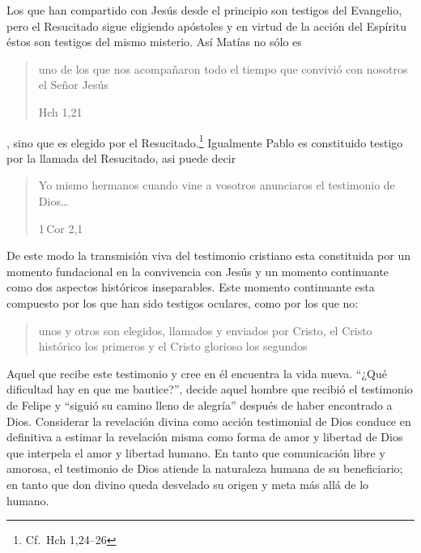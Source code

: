 Los que han compartido con Jesús desde el principio son testigos del Evangelio,
pero el Resucitado sigue eligiendo apóstoles y en virtud de la acción del
Espíritu éstos son testigos del mismo misterio.\autocite[Cf.][576]{ninot2009tf}
Así Matías no sólo es \blockquote[Hch 1,21]{uno de los que nos acompañaron todo
  el tiempo que convivió con nosotros el Señor Jesús}, sino que es elegido por
el Resucitado.\footnote{Cf.~Hch 1,24--26} Igualmente Pablo es constituido
testigo por la llamada del Resucitado, asi puede decir \blockquote[1\,Cor
2,1]{Yo mismo hermanos cuando vine a vosotros anunciaros el testimonio de
  Dios\ldots}. De este modo la transmisión viva del testimonio cristiano esta
constituida por un momento fundacional en la convivencia con Jesús y un momento
continuante como dos aspectos históricos
inseparables.\autocite[Cf.][148]{prades2015testimonio} Este momento continuante
esta compuesto por los que han sido testigos oculares, como por los que no:
\blockquote[{\cite[148]{prades2015testimonio}}]{unos y otros son elegidos,
  llamados y enviados por Cristo, el Cristo histórico los primeros y el Cristo
  glorioso los segundos}. Aquel que recibe este testimonio y cree en él
encuentra la vida nueva. \enquote{¿Qué dificultad hay en que me bautice?},
decide aquel hombre que recibió el testimonio de Felipe y \enquote{siguió su
  camino lleno de alegría} después de haber encontrado a Dios. Considerar la
revelación divina como acción testimonial de Dios conduce en definitiva a
estimar la revelación misma como forma de amor y libertad de Dios que interpela
el amor y libertad humano. En tanto que comunicación libre y amorosa, el
testimonio de Dios atiende la naturaleza humana de su beneficiario; en tanto que
don divino queda desvelado su origen y meta más allá de lo
humano.\autocite[Cf.][152]{prades2015testimonio}
